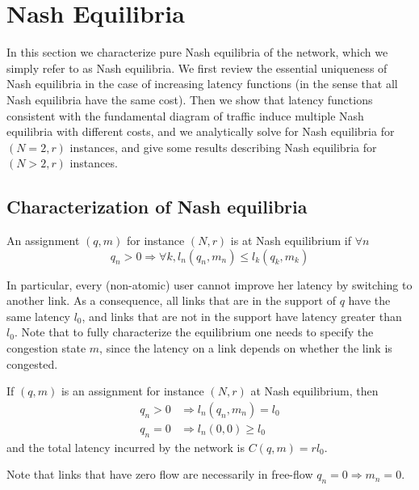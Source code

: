 \section{Nash Equilibria}
In this section we characterize pure Nash equilibria of the network, which we simply refer to as Nash equilibria. We first review the essential uniqueness of Nash equilibria in the case of increasing latency functions (in the sense that all Nash equilibria have the same cost). Then we show that latency functions consistent with the fundamental diagram of traffic induce multiple Nash equilibria with different costs, and we analytically solve for Nash equilibria for $(N = 2, r)$ instances, and give some results describing Nash equilibria for $(N>2, r)$ instances.

\subsection{Characterization of Nash equilibria}

\begin{definition}
An assignment $(q, m)$ for instance $(N, r)$ is at Nash equilibrium if $\forall n$
\[
q_n > 0 \Rightarrow \forall k, l_n(q_n, m_n) \leq l_k(q_k, m_k)
\]
\end{definition}

In particular, every (non-atomic) user cannot improve her latency by switching to another link. As a consequence, all links that are in the support of $q$ have the same latency $l_0$, and links that are not in the support have latency greater than $l_0$. Note that to fully characterize the equilibrium one needs to specify the congestion state $m$, since the latency on a link depends on whether the link is congested.

\begin{lemma}
\label{lemma:nash_eq}
If $(q, m)$ is an assignment for instance $(N, r)$ at Nash equilibrium, then
\begin{align*}
q_n >0 &\Rightarrow l_n(q_n, m_n) = l_0\\
q_n = 0 &\Rightarrow l_n(0, 0) \geq l_0
\end{align*}
and the total latency incurred by the network is $C(q, m) = r l_0$.
\end{lemma}

Note that links that have zero flow are necessarily in free-flow $q_n = 0 \Rightarrow m_n = 0$.

